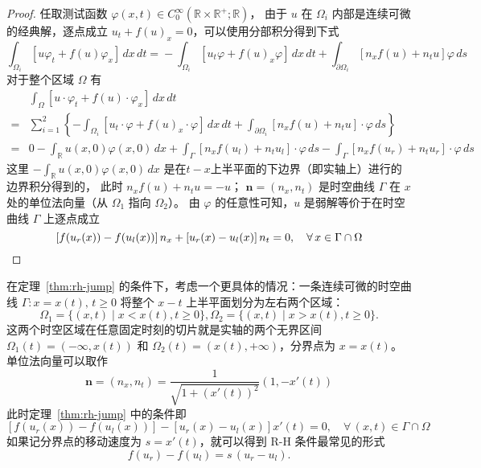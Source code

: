 \begin{proof}
    任取测试函数 $\varphi(x,t) \in C_0^\infty(\mathbb{R} \times \mathbb{R}^+;\mathbb{R})$，
    由于 $u$ 在 $\Omega_i$ 内部是连续可微的经典解，逐点成立 $u_t + f(u)_x = 0$，可以使用分部积分得到下式
    \[
        \int_{\Omega_i}[u \varphi_t + f(u) \varphi_x]\,dx\,dt
            ={}  - \int_{\Omega_i}
        [u_t \varphi + f(u)_x \varphi]\,dx\,dt
        + \int_{\partial \Omega_i}
        [ n_x f(u) + n_t u] \varphi\,ds
    \]
    对于整个区域 $\Omega$ 有
    \begin{align*}
            & \int_{\Omega}[u \cdot \varphi_t + f(u) \cdot \varphi_x]\,dx\,dt
        \\
        ={} & \sum_{i=1}^2 \left\{
        - \int_{\Omega_i}
        [u_t \cdot \varphi + f(u)_x \cdot \varphi]\,dx\,dt
        + \int_{\partial \Omega_i}
        [ n_x f(u) + n_t u]\cdot \varphi\,ds
        \right\}
        \\
        ={} & 0  - \int_{\mathbb{R}} u(x,0)\varphi(x,0)\,dx + \int_{\Gamma}[ n_x f(u_l) + n_t u_l]\cdot \varphi\,ds
        - \int_{\Gamma}[ n_x f(u_r) + n_t u_r]\cdot \varphi\,ds
    \end{align*}
    这里 $- \int_{\mathbb{R}} u(x,0)\varphi(x,0)\,dx$ 是在$t\!-\!x$上半平面的下边界（即实轴上）进行的边界积分得到的，
    此时 $n_x f(u) + n_t u = - u$；
    $\bm{n}=(n_x,n_t)$ 是时空曲线 $\Gamma$ 在 $x$ 处的单位法向量（从 $\Omega_1$ 指向 $\Omega_2$）。
    由 $\varphi$ 的任意性可知，$u$ 是弱解等价于在时空曲线 $\Gamma$ 上逐点成立
    \[
        \left[f(u_r(x)) - f(u_l(x))\right]n_x +
        \left[u_r(x) - u_l(x)\right]n_t = 0, \quad \forall\, x \in \Gamma \cap \Omega \qedhere
    \]
\end{proof}

在定理~\ref{thm:rh-jump} 的条件下，考虑一个更具体的情况：一条连续可微的时空曲线 $\Gamma: x=x(t),\, t \ge 0$ 将整个 $x-t$ 上半平面划分为左右两个区域：
\[
    \Omega_1 = \{(x,t) \mid x < x(t), t \ge 0\},
    \Omega_2 = \{(x,t) \mid x > x(t), t \ge 0\}.
\]
这两个时空区域在任意固定时刻的切片就是实轴的两个无界区间 $\Omega_1(t) =(-\infty,x(t))$ 和 $\Omega_2(t) = (x(t),+\infty)$，分界点为 $x=x(t)$。
单位法向量可以取作
\[
    \bm{n} = (n_x,n_t) = \frac{1}{\sqrt{1+(x'(t))^2}} (1,-x'(t))
\]
此时定理~\ref{thm:rh-jump} 中的条件即
\[
    \left[f(u_r(x)) - f(u_l(x))\right] - \left[u_r(x) - u_l(x)\right]x'(t) = 0, \quad \forall\, (x,t) \in \Gamma \cap \Omega
\]
如果记分界点的移动速度为 $s = x'(t)$，就可以得到 R-H 条件最常见的形式
\begin{equation}
    f(u_r) - f(u_l) = s\,(u_r - u_l).\label{eq:rh-jump}
\end{equation}



